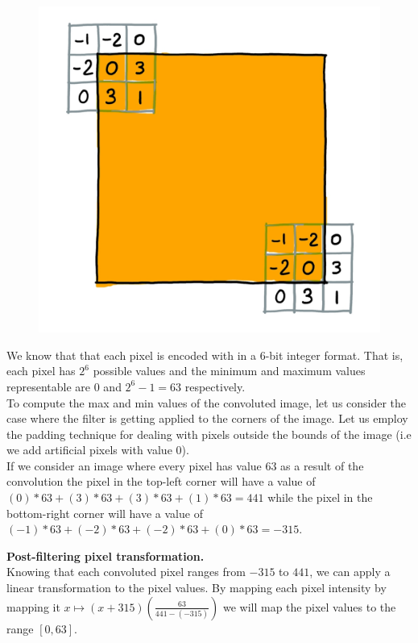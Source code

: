 \documentclass[tikz,14pt,fleqn]{article}
\begin{document}
\begin{figure}
    \centering
    \includegraphics[width=1\linewidth]{fig/1.1.jpg}
    \label{fig:1.1}
\end{figure}
We know that that each pixel is encoded with in a 6-bit integer format. That is, each pixel has $2^6$ possible values and the minimum and maximum values representable are $0$ and $2^6-1=63$ respectively.\\
To compute the max and min values of the convoluted image, let us consider the case where the filter is getting applied to the corners of the image. Let us employ the padding technique for dealing with pixels outside the bounds of the image (i.e we add artificial pixels with value $0$).\\
If we consider an image where every pixel has value $63$ as a result of the convolution the pixel in the top-left corner will have a value of $(0)*63+(3)*63+(3)*63+(1)*63 = 441$  while the pixel in the bottom-right corner will have a value of $(-1)*63+(-2)*63+(-2)*63+(0)*63 = -315$.

\textbf{Post-filtering pixel transformation.}\\
Knowing that each convoluted pixel ranges from $-315$ to $441$, we can apply a linear transformation to the pixel values. By mapping each pixel intensity by mapping it $x \mapsto (x+315)(\frac{63}{441-(-315)})$ we will map the pixel values to the range $[0,63]$.
\end{document}
